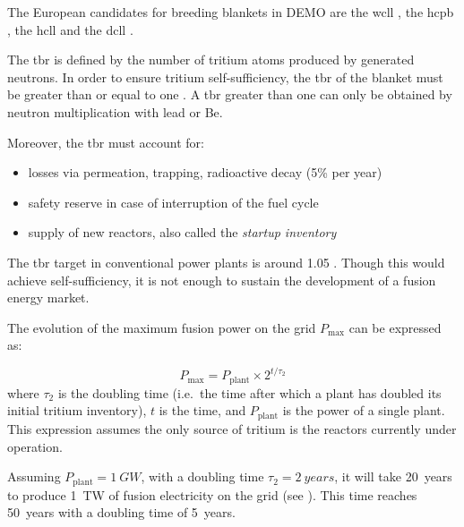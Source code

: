 The European candidates for \glspl{breeding blanket} in DEMO are the \gls{wcll} , the \gls{hcpb} , the \gls{hcll}  and the \gls{dcll}  .

The \gls{tbr} is defined by the number of tritium atoms produced by generated neutrons.
In order to ensure tritium self-sufficiency, the \gls{tbr} of the blanket must be greater than or equal to one .
A \gls{tbr} greater than one can only be obtained by neutron multiplication with lead or \gls{Be}.

Moreover, the \gls{tbr} must account for:
\begin{itemize}
    \item losses via \gls{permeation}, \gls{trapping}, radioactive decay (5\% per year)
    \item safety reserve in case of interruption of the fuel cycle
    \item supply of new reactors, also called the \emph{\gls{startup inventory}}
\end{itemize}

The \gls{tbr} target in conventional power plants is around 1.05 .
Though this would achieve self-sufficiency, it is not enough to sustain the development of a fusion energy market.

The evolution of the maximum fusion power on the grid $P_\mathrm{max}$ can be expressed as:

\begin{equation}
    P_\mathrm{max} = P_\mathrm{plant} \times 2^{t/\tau_2}
\end{equation}
where $\tau_2$ is the doubling time (i.e.\ the time after which a plant has doubled its initial tritium \gls{inventory}), $t$ is the time, and $P_\mathrm{plant}$ is the power of a single plant.
This expression assumes the only source of tritium is the reactors currently under operation.

Assuming $P_\mathrm{plant} = \SI{1}{GW}$, with a doubling time $\tau_2 = \SI{2}{years}$, it will take \SI{20}{years} to produce \SI{1}{TW} of fusion electricity on the grid (see ).
This time reaches \SI{50}{years} with a doubling time of \SI{5}{years}.


